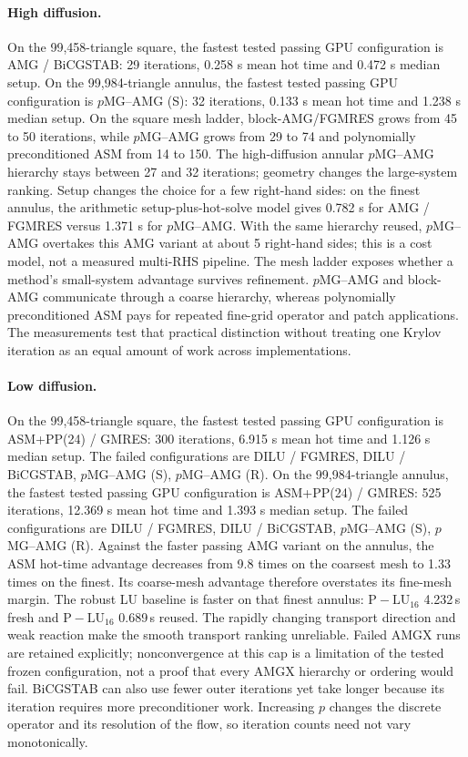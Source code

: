 \paragraph{High diffusion.}
On the 99,458-triangle square, the fastest tested passing GPU configuration is AMG / BiCGSTAB: 29 iterations, 0.258 s mean hot time and 0.472 s median setup. On the 99,984-triangle annulus, the fastest tested passing GPU configuration is $p$MG--AMG (S): 32 iterations, 0.133 s mean hot time and 1.238 s median setup. On the square mesh ladder, block-AMG/FGMRES grows from 45 to 50 iterations, while $p$MG--AMG grows from 29 to 74 and polynomially preconditioned ASM from 14 to 150. The high-diffusion annular $p$MG--AMG hierarchy stays between 27 and 32 iterations; geometry changes the large-system ranking. Setup changes the choice for a few right-hand sides: on the finest annulus, the arithmetic setup-plus-hot-solve model gives 0.782 s for AMG / FGMRES versus 1.371 s for $p$MG--AMG. With the same hierarchy reused, $p$MG--AMG overtakes this AMG variant at about 5 right-hand sides; this is a cost model, not a measured multi-RHS pipeline.
The mesh ladder exposes whether a method's small-system advantage survives
refinement. $p$MG--AMG and block-AMG communicate through a coarse hierarchy,
whereas polynomially preconditioned ASM pays for repeated fine-grid operator and patch applications.
The measurements test that practical distinction without treating one Krylov
iteration as an equal amount of work across implementations.

\paragraph{Low diffusion.}
On the 99,458-triangle square, the fastest tested passing GPU configuration is ASM+PP(24) / GMRES: 300 iterations, 6.915 s mean hot time and 1.126 s median setup. The failed configurations are DILU / FGMRES, DILU / BiCGSTAB, $p$MG–AMG (S), $p$MG–AMG (R). On the 99,984-triangle annulus, the fastest tested passing GPU configuration is ASM+PP(24) / GMRES: 525 iterations, 12.369 s mean hot time and 1.393 s median setup. The failed configurations are DILU / FGMRES, DILU / BiCGSTAB, $p$MG–AMG (S), $p$MG–AMG (R). Against the faster passing AMG variant on the annulus, the ASM hot-time advantage decreases from 9.8 times on the coarsest mesh to 1.33 times on the finest. Its coarse-mesh advantage therefore overstates its fine-mesh margin. The robust LU baseline is faster on that finest annulus: $\mathrm{P\!-\!LU}_{16}$ 4.232\,s fresh and $\mathrm{P\!-\!LU}_{16}$ 0.689\,s reused.
The rapidly changing transport direction and weak reaction make the smooth
transport ranking unreliable. Failed AMGX runs are retained explicitly;
nonconvergence at this cap is a limitation of the tested frozen configuration,
not a proof that every AMGX hierarchy or ordering would fail. BiCGSTAB can also
use fewer outer iterations yet take longer because its iteration requires more
preconditioner work. Increasing $p$ changes the discrete operator and its
resolution of the flow, so iteration counts need not vary monotonically.

